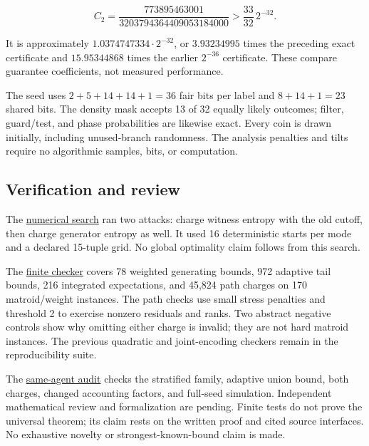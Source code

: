 \documentclass[11pt]{article}
\begin{document}
\[C_2=\frac{773895463001}{3203794364409053184000}
>\frac{33}{32}\,2^{-32}.\]

It is approximately \(1.0374747334\cdot2^{-32}\), or \(3.93234995\) times the preceding exact certificate and \(15.95344868\) times the earlier \(2^{-36}\) certificate. These compare guarantee coefficients, not measured performance.

The seed uses \(2+5+14+14+1=36\) fair bits per label and \(8+14+1=23\) shared bits. The density mask accepts 13 of 32 equally likely outcomes; filter, guard/test, and phase probabilities are likewise exact. Every coin is drawn initially, including unused-branch randomness. The analysis penalties and tilts require no algorithmic samples, bits, or computation.

\subsection{Verification and review}\label{verification-and-review}

The \href{https://github.com/shea256/matroid-prophet-inequality/blob/master/experiments/search_rank_charged.py}{numerical search} ran two attacks: charge witness entropy with the old cutoff, then charge generator entropy as well. It used 16 deterministic starts per mode and a declared 15-tuple grid. No global optimality claim follows from this search.

The \href{https://github.com/shea256/matroid-prophet-inequality/blob/master/verification/check_rank_charged.py}{finite checker} covers 78 weighted generating bounds, 972 adaptive tail bounds, 216 integrated expectations, and 45,824 path charges on 170 matroid/weight instances. The path checks use small stress penalties and threshold 2 to exercise nonzero residuals and ranks. Two abstract negative controls show why omitting either charge is invalid; they are not hard matroid instances. The previous quadratic and joint-encoding checkers remain in the reproducibility suite.

The \href{https://github.com/shea256/matroid-prophet-inequality/blob/master/proofs/rank_charged_audit.md}{same-agent audit} checks the stratified family, adaptive union bound, both charges, changed accounting factors, and full-seed simulation. Independent mathematical review and formalization are pending. Finite tests do not prove the universal theorem; its claim rests on the written proof and cited source interfaces. No exhaustive novelty or strongest-known-bound claim is made.
\end{document}
